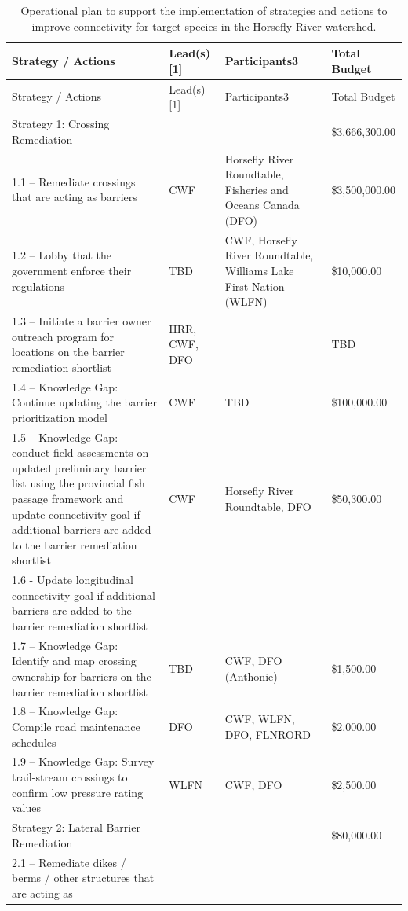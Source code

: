 \documentclass[
  letterpaper,
  DIV=11,
  numbers=noendperiod]{scrreprt}
\begin{document}
\hypertarget{tbl-opplan}{}
\begin{longtable}[]{@{}llll@{}}
\caption{\label{tbl-opplan}Operational plan to support the
implementation of strategies and actions to improve connectivity for
target species in the Horsefly River
watershed.}\label{T_2047d_}\tabularnewline
\toprule\noalign{}
Strategy / Actions & Lead(s) {[}1{]} & Participants3 & Total Budget \\
\midrule\noalign{}
\endfirsthead
\toprule\noalign{}
Strategy / Actions & Lead(s) {[}1{]} & Participants3 & Total Budget \\
\midrule\noalign{}
\endhead
\bottomrule\noalign{}
\endlastfoot
Strategy 1: Crossing Remediation & & & \$3,666,300.00 \\
1.1 -- Remediate crossings that are acting as barriers & CWF & Horsefly
River Roundtable, Fisheries and Oceans Canada (DFO) & \$3,500,000.00 \\
1.2 -- Lobby that the government enforce their regulations & TBD & CWF,
Horsefly River Roundtable, Williams Lake First Nation (WLFN) &
\$10,000.00 \\
1.3 -- Initiate a barrier owner outreach program for locations on the
barrier remediation shortlist & HRR, CWF, DFO & & TBD \\
1.4 -- Knowledge Gap: Continue updating the barrier prioritization model
& CWF & TBD & \$100,000.00 \\
1.5 -- Knowledge Gap: conduct field assessments on updated preliminary
barrier list using the provincial fish passage framework and update
connectivity goal if additional barriers are added to the barrier
remediation shortlist & CWF & Horsefly River Roundtable, DFO &
\$50,300.00 \\
1.6 - Update longitudinal connectivity goal if additional barriers are
added to the barrier remediation shortlist & & & \\
1.7 -- Knowledge Gap: Identify and map crossing ownership for barriers
on the barrier remediation shortlist & TBD & CWF, DFO (Anthonie) &
\$1,500.00 \\
1.8 -- Knowledge Gap: Compile road maintenance schedules & DFO & CWF,
WLFN, DFO, FLNRORD & \$2,000.00 \\
1.9 -- Knowledge Gap: Survey trail-stream crossings to confirm low
pressure rating values & WLFN & CWF, DFO & \$2,500.00 \\
Strategy 2: Lateral Barrier Remediation & & & \$80,000.00 \\
2.1 -- Remediate dikes / berms / other structures that are acting as

\end{longtable}
\end{document}
